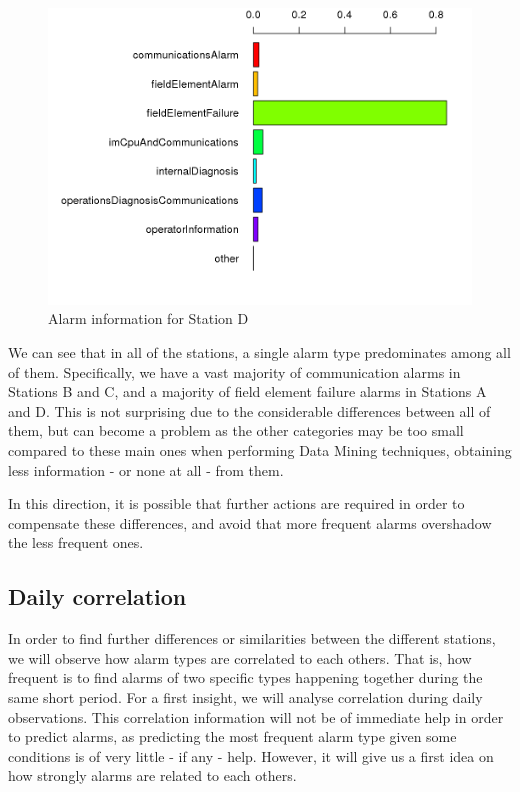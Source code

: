 \begin{figure}[htb]
 \centering
 \includegraphics[width=\textwidth]{./img/sevilla_graph.png}
 \caption{Alarm information for Station D}
 \label{fig:sevilla_chart}
\end{figure}

\clearpage

We can see that in all of the stations, a single alarm type predominates among all of them. Specifically, we have a vast majority of communication alarms in Stations B and C, and a majority of field element failure alarms in Stations A and D. This is not surprising due to the considerable differences between all of them, but can become a problem as the other categories may be too small compared to these main ones when performing Data Mining techniques, obtaining less information - or none at all - from them.

In this direction, it is possible that further actions are required in order to compensate these differences, and avoid that more frequent alarms overshadow the less frequent ones.

\subsection{Daily correlation}
In order to find further differences or similarities between the different stations, we will observe how alarm types are correlated to each others\cite{edwards1976introduction}. That is, how frequent is to find alarms of two specific types happening together during the same short period. For a first insight, we will analyse correlation during daily observations. This correlation information will not be of immediate help in order to predict alarms, as predicting the most frequent alarm type given some conditions is of very little - if any - help. However, it will give us a first idea on how strongly alarms are related to each others.

